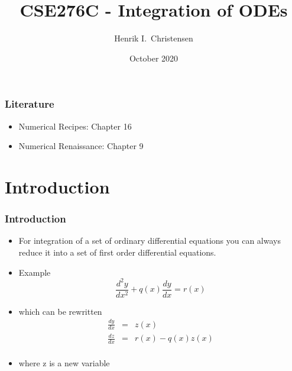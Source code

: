 \documentclass[10pt]{beamer}
\title[Math for Robotics] %
{CSE276C - Integration of ODEs}
\author[H.~I. Christensen] %
{Henrik I.~Christensen}
\institute[UCSD] %
{
  \begin{minipage}[c]{.2\textwidth}
    \texttt{[image: ucsealnew]}%
  \end{minipage}%
  \begin{minipage}[c]{.6\textwidth}
    \small
      Computer Science and Engineering\\
      University of California, San Diego\\
      \myemph{\url{http://cri.ucsd.edu}}\\          

  \end{minipage}
}
\date[Oct 2020]%
{\small%
  October 2020}
\begin{document}
  


\begin{frame}[plain]
  \titlepage
\end{frame}

\begin{frame}
  \frametitle{Literature }
  \begin{itemize}
  \item Numerical Recipes: Chapter 16
  \item Numerical Renaissance: Chapter 9
  \end{itemize}
\end{frame}

\section{Introduction}

\begin{frame}
  \frametitle{Introduction}
  \begin{itemize}
  \item For integration of a set of ordinary differential equations
    you can always reduce it into a set of first order differential
    equations. 
  \item Example
    \[
      \frac{d^2 y}{d x^2} + q(x) \frac{dy}{dx} = r(x)
    \]
  \item which can be rewritten
    \[
      \begin{array}{rcl}
        \frac{dy}{dx} & = & z(x)\\
        \frac{dz}{dx} & = & r(x)  - q(x) z(x) \\
      \end{array}
    \]
  \item where z is a new variable
  \end{itemize}  
\end{frame}
\end{document}
